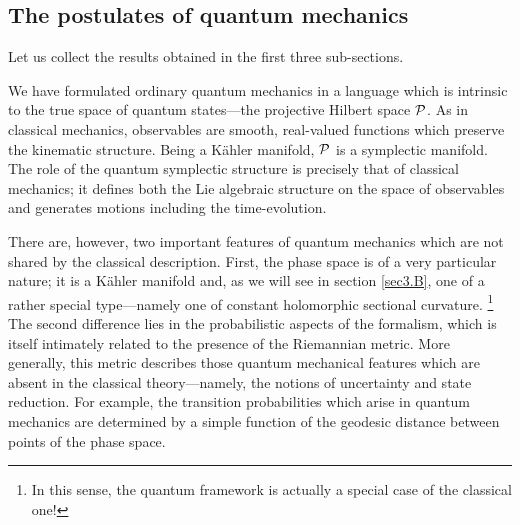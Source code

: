 \documentclass[12pt,aps,eqsecnum,tighten]{revtex4-2}
\def\P{{\cal P}}
\begin{document}
\subsection{The postulates of quantum mechanics} \label{sec2.D}

Let us collect the results obtained in the first three sub-sections.

We have formulated ordinary quantum mechanics in a language which is
intrinsic to the true space of quantum states---the projective Hilbert
space $\P$.  As in classical mechanics, observables are smooth,
real-valued functions which preserve the kinematic structure.  Being a
K\"ahler manifold, $\P$ is a symplectic manifold.  The role of the
quantum symplectic structure is precisely that of classical mechanics;
it defines both the Lie algebraic structure on the space of
observables and generates motions including the time-evolution.

There are, however, two important features of quantum mechanics which
are not shared by the classical description.  First, the phase space
is of a very particular nature; it is a K\"ahler manifold and, as we
will see in section \ref{sec3.B}, one of a rather special
type---namely one of constant holomorphic sectional curvature.%
%
\footnote{In this sense, the quantum framework is actually a special 
case of the classical one!}
%
The second difference lies in the probabilistic aspects of the
formalism, which is itself intimately related to the presence of the
Riemannian metric. More generally, this metric describes those quantum
mechanical features which are absent in the classical theory---namely,
the notions of uncertainty and state reduction.  For example, the
transition probabilities which arise in quantum mechanics are
determined by a simple function of the geodesic distance between
points of the phase space.
\end{document}
